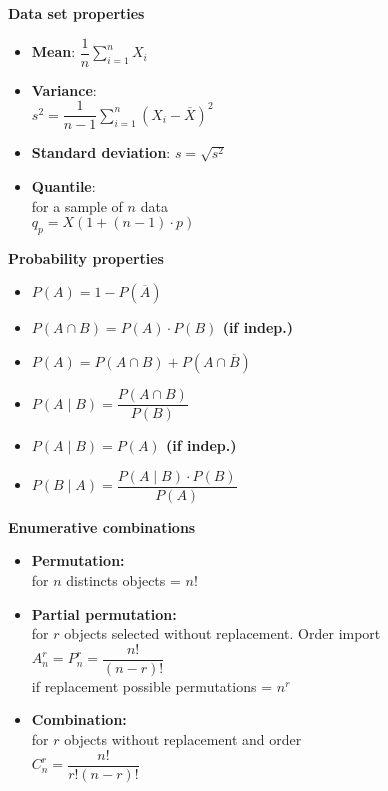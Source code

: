\documentclass[a4paper, 10pt, landscape]{article}
\begin{document}
\newcommand{\indep}{\rotatebox[origin=c]{90}{$\models$}}

\begin{multicols*}{4}
\scriptsize
\textbf{\footnotesize Data set properties}

\begin{itemize}
\item{\textbf{Mean}: $\dfrac{1}{n} \displaystyle{\sum_{i=1}^{n} X_i }$}
\item{\textbf{Variance}: \\ \textbullet $s^2 = \dfrac{1}{n-1} \displaystyle{\sum_{i=1}^n \left( X_i - \overline{X}\right) ^2}$ }
\item{\textbf{Standard deviation}: $s = \sqrt{s^2}$}
\item{\textbf{Quantile}: \\ for a sample of $n$ data \\ $q_p = X \left( 1 + (n-1)\cdot p\right)$}
\end{itemize}


\textbf{\footnotesize Probability properties}

\begin{itemize}
\item[\textbullet]{\textbf{$P(A) = 1 - P \left( \overline{A} \right)$}}
\item[\textbullet]{\textbf{$P \left( A\cap B\right) = P(A) \cdot P(B)$ (if indep.)}}
\item[\textbullet]{\textbf{$P(A) = P \left( A \cap B \right)+ P \left( A \cap \overline{B} \right) $}}
\item[\textbullet]{\textbf{$P(A\mid B) = \dfrac{P(A \cap B)}{P(B)}$}}
\item[\textbullet]{\textbf{$P(A\mid B) = P(A)$ (if indep.)} }
\item[\textbullet]{\textbf{$P(B\mid A) = \dfrac{P(A\mid B) \cdot P(B)}{P(A)}$}}
\end{itemize}


\textbf{\footnotesize Enumerative combinations}
\begin{itemize}
\item{\textbf{Permutation:} \\ for $n$ distincts objects = $n!$ }
\item{\textbf{Partial permutation:} \\ for $r$ objects selected without replacement. Order import\\ $A_n^r = P_n^r = \dfrac{n!}{(n-r)!}$ \\ if replacement possible permutations = $n^r$}
\item{\textbf{Combination:} \\  for $r$ objects without replacement and order \\ $C_n^r = \dfrac{n!}{r!(n-r)!}$}
\end{itemize}


\end{multicols*}
\end{document}
